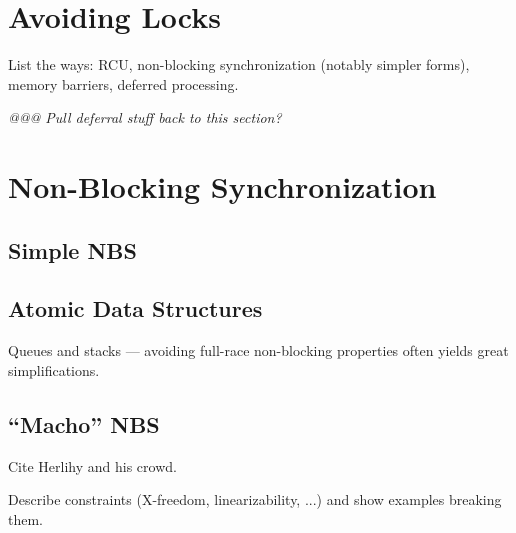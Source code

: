 

\section{Avoiding Locks}
\label{sec:advsync:Avoiding Locks}

List the ways: RCU, non-blocking synchronization (notably simpler forms),
memory barriers, deferred processing.

\emph{@@@ Pull deferral stuff back to this section?}



\section{Non-Blocking Synchronization}
\label{sec:advsync:Non-Blocking Synchronization}

\subsection{Simple NBS}
\label{sec:advsync:Simple NBS}

\subsection{Atomic Data Structures}
\label{sec:advsync:Atomic Data Structures}

Queues and stacks --- avoiding full-race non-blocking properties
often yields great simplifications.

\subsection{``Macho'' NBS}
\label{sec:advsync:``Macho'' NBS}

Cite Herlihy and his crowd.

Describe constraints (X-freedom, linearizability, ...) and show examples
breaking them.
